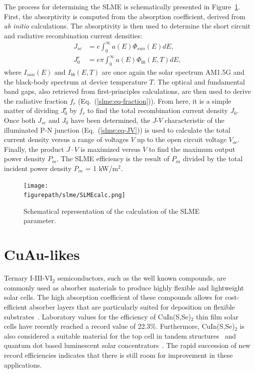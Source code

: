 \begin{refsection}
The process for determining the SLME is schematically presented in 
Figure~\ref{slme:fig-SLMEcalc}. First, the absorptivity is computed from the 
absorption coefficient, derived from \textit{ab initio} calculations. 
The absorptivity is then used to determine the short 
circuit and radiative recombination current densities: 
\begin{equation} \label{slme:eq-currents} 
\begin{aligned} 
J_{sc} &= e \int_0^\infty a(E)  \Phi_{sun} (E) dE, 
\\ J_0^r &= e\pi \int_0^\infty a(E)  \Phi_{bb} (E,T) dE, 
\end{aligned} 
\end{equation} 
where $I_{sun}(E)$ and $I_{bb}(E,T)$ are once again the solar spectrum AM1.5G  
and the black-body spectrum at device temperature $T$. The optical 
and fundamental band gaps, also retrieved from first-principles calculations, 
are then used to derive the radiative fraction $f_r$ (Eq.~(\ref{slme:eq-fraction})). From 
here, it is a simple matter of dividing $J_0^r$ by $f_r$ to find the total 
recombination current density $J_0$. Once both $J_{sc}$ and $J_0$ have been determined, the $J$-$V$ characteristic of the illuminated P-N junction 
(Eq.~(\ref{slme:eq-JV})) is used to calculate the total current density versus a range 
of voltages $V$ up to the open circuit voltage $V_{oc}$. Finally,  
the product $J\cdot V$ is maximized versus $V$ to find the maximum output power density 
$P_m$. The SLME efficiency is the result of $P_m$ divided by the total 
incident power density $P_{in}$ = 1 kW/m$^2$. 
 
 
\begin{figure}[ht]  
\centering 
\texttt{[image: \\figurepath/slme/SLMEcalc.png]} 
\caption{Schematical representation of the calculation of the SLME parameter.} 
\label{slme:fig-SLMEcalc} 
\end{figure} 
 
\section{CuAu-likes} \label{slme:sec-CuAu} 
 
Ternary I-III-VI$_2$ semiconductors, such as the well known 
 compounds, are commonly used as absorber materials to 
produce highly flexible and lightweight solar cells. The high absorption 
coefficient of these compounds allows for cost-efficient absorber layers that 
are particularly suited for deposition on flexible 
substrates~\cite{Reinhard2013}. Laboratory values for the efficiency of 
CuIn(S,Se)$_2$ thin film solar cells have recently reached a record value of 
22.3\%. Furthermore, CuIn(S,Se)$_2$ is also considered a suitable material for 
the top cell in tandem structures~\cite{Cheek2013} and quantum dot based 
luminescent solar concentrators~\cite{Hu2015}. The rapid succession of new 
record efficiencies indicates that there is still room for improvement in 
these applications. 
 

\end{refsection}
